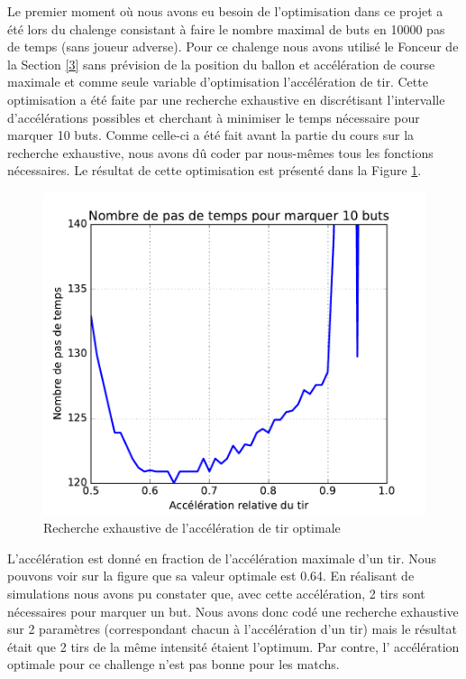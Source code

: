 \documentclass[a4paper,12pt]{article}
\begin{document}
Le premier moment où nous avons eu besoin de l'optimisation dans ce projet a été lors du chalenge consistant à faire le nombre maximal de buts en 10000 pas de temps (sans joueur adverse). Pour ce chalenge nous avons utilisé le Fonceur de la Section \ref{3} sans prévision de la position du ballon et accélération de course maximale et comme seule variable d'optimisation l'accélération de tir. Cette optimisation a été faite par une recherche exhaustive en discrétisant l’intervalle d'accélérations possibles et cherchant à minimiser le temps nécessaire pour marquer 10 buts. Comme celle-ci a été fait avant la partie du cours sur la recherche exhaustive, nous avons dû coder par nous-mêmes tous les fonctions nécessaires. Le résultat de cette optimisation est présenté dans la Figure \ref{Figure2}. 

\begin{figure}[ht]
\centering
\includegraphics[scale = 0.67]{param_search_chalenge}
\caption{Recherche exhaustive de l'accélération de tir optimale}
\label{Figure2}
\end{figure}

L'accélération est donné en fraction de l'accélération maximale d'un tir. Nous pouvons voir sur la figure que sa valeur optimale est 0.64. En réalisant de simulations nous avons pu constater que, avec cette accélération, 2 tirs sont nécessaires pour marquer un but. Nous avons donc codé une recherche exhaustive sur 2 paramètres (correspondant chacun à l’accélération d'un tir) mais le résultat était que 2 tirs de la même intensité étaient l'optimum. Par contre, l' accélération optimale pour ce challenge n'est pas bonne pour les matchs.
\end{document}
